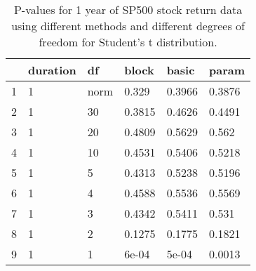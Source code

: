 \begin{table}[ht]
\centering
\caption{P-values for 1 year of SP500 stock return data using different 
  methods
  and different degrees of freedom for Student's t distribution.} 
\label{table:SP5001}
\begin{tabular}{rlllll}
  \hline
 & duration & df & block & basic & param \\ 
  \hline
1 & 1 & norm & 0.329 & 0.3966 & 0.3876 \\ 
  2 & 1 & 30 & 0.3815 & 0.4626 & 0.4491 \\ 
  3 & 1 & 20 & 0.4809 & 0.5629 & 0.562 \\ 
  4 & 1 & 10 & 0.4531 & 0.5406 & 0.5218 \\ 
  5 & 1 & 5 & 0.4313 & 0.5238 & 0.5196 \\ 
  6 & 1 & 4 & 0.4588 & 0.5536 & 0.5569 \\ 
  7 & 1 & 3 & 0.4342 & 0.5411 & 0.531 \\ 
  8 & 1 & 2 & 0.1275 & 0.1775 & 0.1821 \\ 
  9 & 1 & 1 & 6e-04 & 5e-04 & 0.0013 \\ 
   \hline
\end{tabular}
\end{table}

